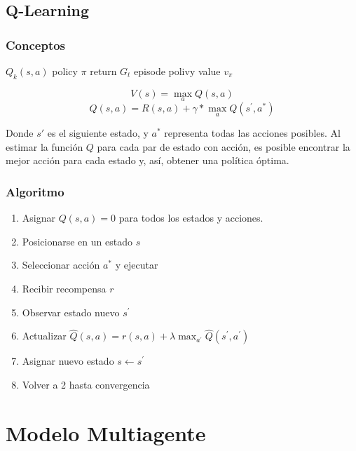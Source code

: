 \subsection{Q-Learning}

\subsubsection{Conceptos}

$Q_k(s,a)$
policy $\pi$
return $G_t$ 
episode
polivy value $v_\pi$




$$
V(s) = \max_{a}{Q(s,a)}
$$
$$
Q(s, a) = R(s, a) + \gamma * \max_{a}{Q(s^{'}, a^{*})}
$$

Donde $s{'}$ es el siguiente estado, y $a^{*}$ representa todas las acciones posibles. Al estimar la funci\'on $Q$ para cada par de estado con acci\'on, es posible encontrar la mejor acci\'on para cada estado y, as\'i, obtener una pol\'itica \'optima.

\subsubsection{Algoritmo}

\begin{enumerate}
    \item Asignar $Q(s,a) = 0$ para todos los estados y acciones.
    \item Posicionarse en un estado $s$
    \item Seleccionar acci\'on $a^{*}$ y ejecutar
    \item Recibir recompensa $r$
    \item Observar estado nuevo $s^{'}$
    \item Actualizar $\hat{Q}(s,a) = r(s,a) + \lambda \max _{ a^{'} }{  \hat{Q}(s^{'},a^{'}) }$
    \item Asignar nuevo estado $s \leftarrow s^{'}$
    \item Volver a 2 hasta convergencia
\end{enumerate}



\section{Modelo Multiagente}

